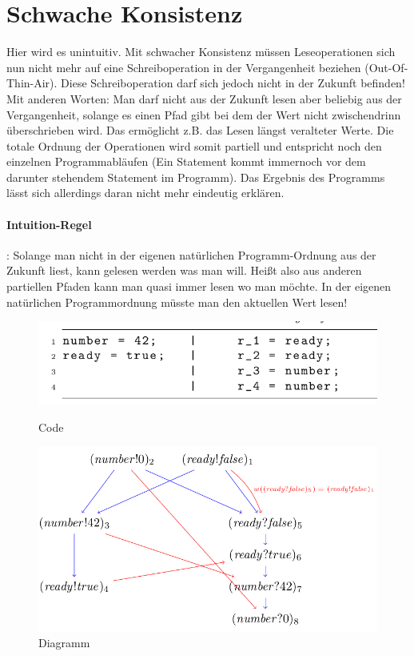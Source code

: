 \documentclass[a4paper,10pt, oneside]{book}
\begin{document}
\section{Schwache Konsistenz}
Hier wird es unintuitiv. Mit schwacher Konsistenz müssen Leseoperationen sich nun nicht mehr auf eine Schreiboperation in der Vergangenheit beziehen (Out-Of-Thin-Air). Diese Schreiboperation darf sich jedoch nicht in der Zukunft befinden! Mit anderen Worten: Man darf nicht aus der Zukunft lesen aber beliebig aus der Vergangenheit, solange es einen Pfad gibt bei dem der Wert nicht zwischendrinn überschrieben wird. Das ermöglicht z.B. das Lesen längst veralteter Werte. Die totale Ordnung der Operationen wird somit partiell und entspricht noch den einzelnen Programmabläufen (Ein Statement kommt immernoch vor dem darunter stehendem Statement im Programm). Das Ergebnis des Programms lässt sich allerdings daran nicht mehr eindeutig erklären.

\paragraph{Intuition-Regel}: Solange man nicht in der eigenen natürlichen Programm-Ordnung aus der Zukunft liest, kann gelesen werden was man will. Heißt also aus anderen partiellen Pfaden kann man quasi immer lesen wo man möchte. In der eigenen natürlichen Programmordnung müsste man den aktuellen Wert lesen!

\begin{figure}[htb]
	
	\begin{minipage}[t]{0.3\linewidth}
		\centering
		\includegraphics[scale=0.3]{KompCode}
		\caption{Code}
	\end{minipage}
	\hfill
	\begin{minipage}[t]{0.6\linewidth}
		\centering
		\includegraphics[scale=0.3]{schwachDia}
		\caption{Diagramm}
	\end{minipage}
\end{figure}
\end{document}
